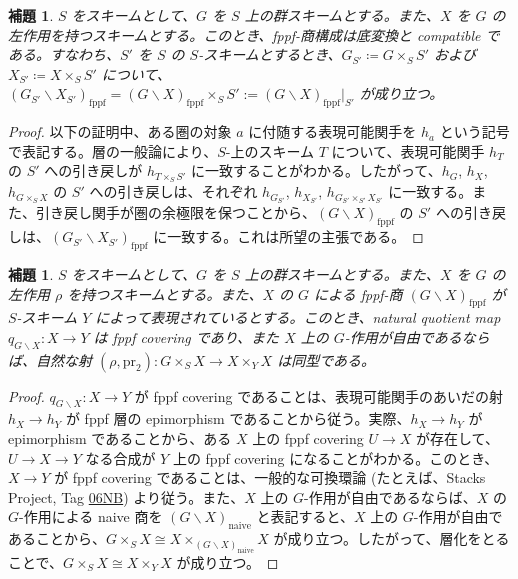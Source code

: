 \documentclass{jsarticle}
\newcommand{\deq}{\coloneqq}
\newcommand{\lquot}{\backslash}
\newcommand{\fppflquot}[2]{(#1 \lquot#2)_\mathrm{fppf}}
\newcommand{\FLQ}[2]{\fppflquot{#1}{#2}}
\newtheorem{lem}[thm]{補題}
\begin{document}
\begin{lem}
  $S$ をスキームとして、$G$ を $S$ 上の群スキームとする。また、$X$ を $G$ の左作用を持つスキームとする。このとき、fppf-商構成は底変換と compatible である。すなわち、$S'$ を $S$ の $S$-スキームとするとき、$G_{S'} \deq G \times_S S'$ および $X_{S'} \deq X \times_S S'$ について、$\FLQ{G_{S'}}{X_{S'}} = \FLQ{G}{X} \times_S S' := \FLQ{G}{X}|_{S'}$ が成り立つ。 
\end{lem}
\begin{proof}
  以下の証明中、ある圏の対象 $a$ に付随する表現可能関手を $h_a$ という記号で表記する。層の一般論により、$S$-上のスキーム $T$ について、表現可能関手 $h_T$ の $S'$ への引き戻しが $h_{T \times_S S'}$ に一致することがわかる。したがって、$h_G$, $h_X$, $h_{G \times_S X}$ の $S'$ への引き戻しは、それぞれ $h_{G_{S'}}$, $h_{X_{S'}}$, $h_{G_{S'} \times_{S'} X_{S'}}$ に一致する。また、引き戻し関手が圏の余極限を保つことから、$\FLQ{G}{X}$ の $S'$ への引き戻しは、$\FLQ{G_{S'}}{X_{S'}}$ に一致する。これは所望の主張である。
\end{proof}

\begin{lem}\label{fppf_quotient_free_action}
  $S$ をスキームとして、$G$ を $S$ 上の群スキームとする。また、$X$ を $G$ の左作用 $\rho$ を持つスキームとする。また、$X$ の $G$ による fppf-商 $\FLQ{G}{X}$ が $S$-スキーム $Y$ によって表現されているとする。このとき、natural quotient map $q_{G \lquot X} \colon X \to Y$ は fppf covering であり、また $X$ 上の $G$-作用が自由であるならば、自然な射 $(\rho, \mathrm{pr}_2) \colon G \times_S X \to X \times_Y X$ は同型である。
\end{lem}
\begin{proof}
  $q_{G \lquot X} \colon X \to Y$ が fppf covering であることは、表現可能関手のあいだの射 $h_X \to h_Y$ が fppf 層の epimorphism であることから従う。実際、$h_X \to h_Y$ が epimorphism であることから、ある $X$ 上の fppf covering $U \to X$ が存在して、$U \to X \to Y$ なる合成が $Y$ 上の fppf covering になることがわかる。このとき、$X \to Y$ が fppf covering であることは、一般的な可換環論 (たとえば、Stacks Project, Tag \href{https://stacks.math.columbia.edu/tag/06NB}{06NB}) より従う。また、$X$ 上の $G$-作用が自由であるならば、$X$ の $G$-作用による naive 商を $(G \lquot X)_\mathrm{naive}$ と表記すると、$X$ 上の $G$-作用が自由であることから、$G \times_S X \cong X \times_{(G \lquot X)_\mathrm{naive}} X$ が成り立つ。したがって、層化をとることで、$G \times_S X \cong X \times_Y X$ が成り立つ。
\end{proof}
\end{document}
